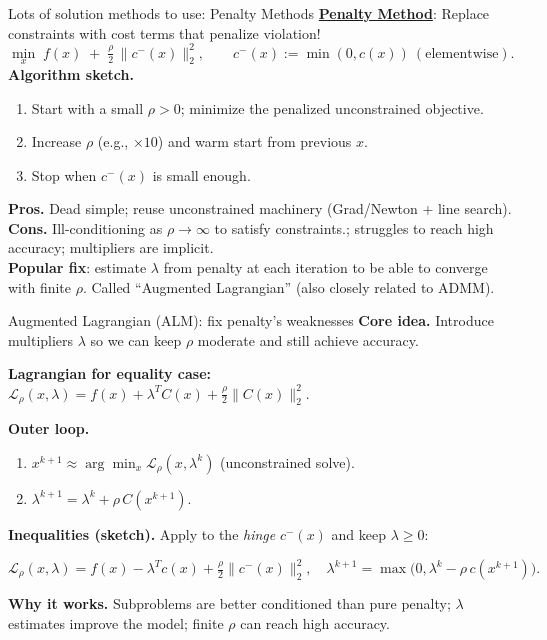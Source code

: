 \begin{frame}{Lots of solution methods to use: Penalty Methods} 
\underline{\textbf{Penalty Method}}: Replace constraints with cost terms that penalize violation!
$$
\min_x\; f(x) \;+\; \tfrac{\rho}{2}\,\big\|c^-(x)\big\|_2^2,\qquad
c^-(x):=\min(0,c(x))\ (\text{elementwise}).
$$
\textbf{Algorithm sketch.}
\begin{enumerate}
\item Start with a small $\rho>0$; minimize the penalized unconstrained objective.
\item Increase $\rho$ (e.g., $\times 10$) and warm start from previous $x$.
\item Stop when $c^-(x)$ is small enough.
\end{enumerate}

\textbf{Pros.} Dead simple; reuse unconstrained machinery (Grad/Newton + line search). \\
\textbf{Cons.} Ill-conditioning as $\rho\to\infty$ to satisfy constraints.; struggles to reach high accuracy; multipliers are implicit. \\
\textbf{Popular fix}: estimate $\lambda$ from penalty at each iteration to be able to converge with finite $\rho$. Called “Augmented Lagrangian” (also closely related to ADMM).
\end{frame}






\begin{frame}{Augmented Lagrangian (ALM): fix penalty’s weaknesses}
\textbf{Core idea.} Introduce multipliers $\lambda$ so we can keep $\rho$ moderate and still achieve accuracy.

\textbf{Lagrangian for equality case:} $\mathcal{L}_\rho(x,\lambda)=f(x)+\lambda^{\!T}C(x)+\tfrac{\rho}{2}\|C(x)\|_2^2.$

\textbf{Outer loop.}
\begin{enumerate}
\item $x^{k+1}\approx \arg\min_x \mathcal{L}_\rho(x,\lambda^k)$ (unconstrained solve).
\item $\lambda^{k+1}=\lambda^k+\rho\,C(x^{k+1})$.
\end{enumerate}

\textbf{Inequalities (sketch).} Apply to the \emph{hinge} $c^-(x)$ and keep $\lambda\ge 0$:

$$
\mathcal{L}_\rho(x,\lambda)=f(x)-\lambda^{\!T}c(x)+\tfrac{\rho}{2}\|c^-(x)\|_2^2,\quad
\lambda^{k+1}=\max\!\big(0,\lambda^k-\rho\,c(x^{k+1})\big).
$$

\textbf{Why it works.} Subproblems are better conditioned than pure penalty; $\lambda$ estimates improve the model; finite $\rho$ can reach high accuracy. 
\end{frame}

